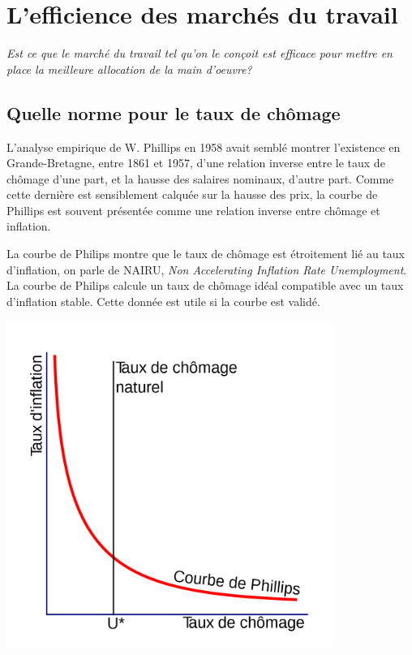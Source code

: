 \documentclass[main.tex]{subfiles}
\begin{document}
        \chapter{L'efficience des marchés du travail} 
        \emph{Est ce que le marché du travail tel qu'on le conçoit est efficace pour mettre en place la meilleure allocation de la main d'oeuvre?}

        \section{Quelle norme pour le taux de chômage}

        L'analyse empirique de W. Phillips en 1958 avait semblé montrer l'existence en Grande-Bretagne, entre 1861 et 1957, d'une relation inverse entre le taux de chômage d'une part, et la hausse des salaires nominaux, d'autre part. Comme cette dernière est sensiblement calquée sur la hausse des prix, la courbe de Phillips est souvent présentée comme une relation inverse entre chômage et inflation.

        \begin{minipage}{0.5\textwidth}
                La courbe de Philips montre que le taux de chômage est étroitement lié au taux d'inflation, on parle de NAIRU, \emph{Non Accelerating Inflation Rate Unemployment}. La courbe de Philips calcule un taux de chômage idéal compatible avec un taux d'inflation stable. Cette donnée est utile si la courbe est validé.         \end{minipage}
        \hfill
        \begin{minipage}{0.5\textwidth}
                \center
                \includegraphics[width=0.8\textwidth]{nairu.png}
        \end{minipage}
        \medskip
\end{document}
